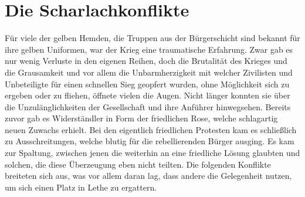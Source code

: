 \documentclass[a4paper,12pt,oneside]{book}
\begin{document}
\section{Die Scharlachkonflikte}
Für viele der gelben Hemden, die Truppen aus der Bürgerschicht sind bekannt für ihre gelben Uniformen, war der Krieg eine traumatische Erfahrung. Zwar gab es nur wenig Verluste in den eigenen Reihen, doch die Brutalität des Krieges und die Grausamkeit und vor allem die Unbarmherzigkeit mit welcher Zivilisten und Unbeteiligte für einen schnellen Sieg geopfert wurden, ohne Möglichkeit sich zu ergeben oder zu fliehen, öffnete vielen die Augen. Nicht länger konnten sie über die Unzulänglichkeiten der Gesellschaft und ihre Anführer hinwegsehen. Bereits zuvor gab es Widerständler in Form der friedlichen Rose, welche schlagartig neuen Zuwachs erhielt. Bei den eigentlich friedlichen Protesten kam es schließlich zu Ausschreitungen, welche blutig für die rebellierenden Bürger ausging. Es kam zur Spaltung, zwischen jenen die weiterhin an eine friedliche Lösung glaubten und solchen, die diese Überzeugung eben nicht teilten. Die folgenden Konflikte breiteten sich aus, was vor allem daran lag, dass andere die Gelegenheit nutzen, um sich einen Platz in Lethe zu ergattern.
\end{document}
